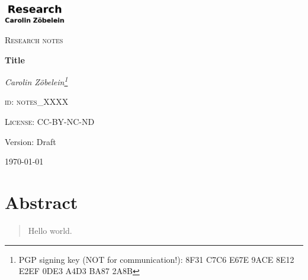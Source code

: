 

\begin{titlepage}
	\begin{center}
    \begin{center}
            \includegraphics[width=0.2\textwidth]{images/logo_web.png}
    \end{center}
    \vspace{1cm}
	{\scshape\Large Research notes\par}	%
	\vspace{1.5cm}
	{\huge\bfseries Title\par}	%
	\vspace{2cm}
	{\Large\itshape Carolin Z\"obelein\footnote{PGP signing key (NOT for communication!): 8F31 C7C6 E67E 9ACE 8E12 E2EF 0DE3 A4D3 BA87 2A8B}\par}
	\vfill
	\textsc{id: notes\_XXXX}\par	%
	\textsc{License: CC-BY-NC-ND}	%
	\vfill


	\vfill

	{\large Version: Draft\par}	%
	{\large \today\par}
	\end{center}
\end{titlepage}
\newpage
\section*{Abstract}
\label{s:abstract}
\begin{abstract}
Hello world.
\end{abstract}

